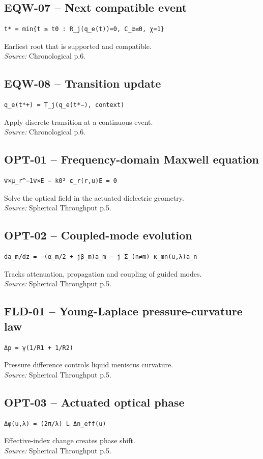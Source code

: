 \documentclass{article}
\begin{document}
\subsection*{EQW-07 -- Next compatible event}
\begin{verbatim}
t* = min{t ≥ t0 : R_j(q_e(t))=0, C_α≤0, χ=1}
\end{verbatim}
Earliest root that is supported and compatible.\\
\textit{Source:} Chronological p.6.
\subsection*{EQW-08 -- Transition update}
\begin{verbatim}
q_e(t*+) = T_j(q_e(t*−), context)
\end{verbatim}
Apply discrete transition at a continuous event.\\
\textit{Source:} Chronological p.6.
\subsection*{OPT-01 -- Frequency-domain Maxwell equation}
\begin{verbatim}
∇×μ_r^−1∇×E − k0² ε_r(r,u)E = 0
\end{verbatim}
Solve the optical field in the actuated dielectric geometry.\\
\textit{Source:} Spherical Throughput p.5.
\subsection*{OPT-02 -- Coupled-mode evolution}
\begin{verbatim}
da_m/dz = −(α_m/2 + jβ_m)a_m − j Σ_(n≠m) κ_mn(u,λ)a_n
\end{verbatim}
Tracks attenuation, propagation and coupling of guided modes.\\
\textit{Source:} Spherical Throughput p.5.
\subsection*{FLD-01 -- Young-Laplace pressure-curvature law}
\begin{verbatim}
Δp = γ(1/R1 + 1/R2)
\end{verbatim}
Pressure difference controls liquid meniscus curvature.\\
\textit{Source:} Spherical Throughput p.5.
\subsection*{OPT-03 -- Actuated optical phase}
\begin{verbatim}
Δφ(u,λ) = (2π/λ) L Δn_eff(u)
\end{verbatim}
Effective-index change creates phase shift.\\
\textit{Source:} Spherical Throughput p.5.
\end{document}
